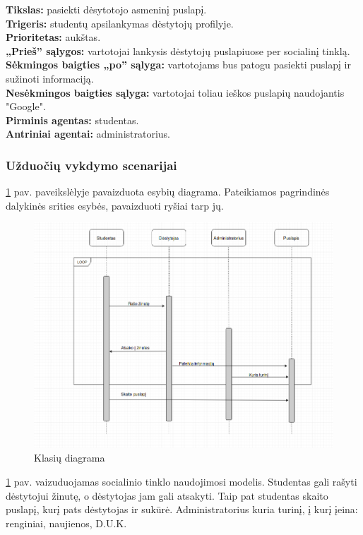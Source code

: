\documentclass{VUMIFPSkursinis}
\begin{document}
\textbf{Tikslas:} pasiekti dėsytotojo asmeninį puslapį.\\
\textbf{Trigeris:} studentų apsilankymas dėstytojų profilyje. \\
\textbf{Prioritetas:} aukštas. \\
\textbf{„Prieš” sąlygos:} vartotojai lankysis dėstytojų puslapiuose per socialinį tinklą.\\
\textbf{Sėkmingos baigties „po” sąlyga:} vartotojams bus patogu pasiekti puslapį ir sužinoti informaciją. \\
\textbf{Nesėkmingos baigties sąlyga:} vartotojai toliau ieškos puslapių naudojantis "Google". \\
\textbf{Pirminis agentas:} studentas. \\
\textbf{Antriniai agentai:} administratorius.

\subsubsection{Užduočių vykdymo scenarijai}
\ref{fig:klasiu} pav. paveikslėlyje pavaizduota esybių diagrama. Pateikiamos pagrindinės dalykinės srities esybės, pavaizduoti ryšiai tarp jų.
\begin{figure}[H]
\includegraphics[width=\linewidth]{img/bendra-uml.png}
\caption{Klasių diagrama}
\label{fig:klasiu}
\end{figure}
\ref{fig:klasiu} pav. vaizuduojamas socialinio tinklo naudojimosi modelis. Studentas gali rašyti dėstytojui žinutę, o dėstytojas jam gali atsakyti. Taip pat studentas skaito puslapį, kurį pats dėstytojas ir sukūrė. Administratorius kuria turinį, į kurį įeina: renginiai, naujienos, D.U.K.
\end{document}
